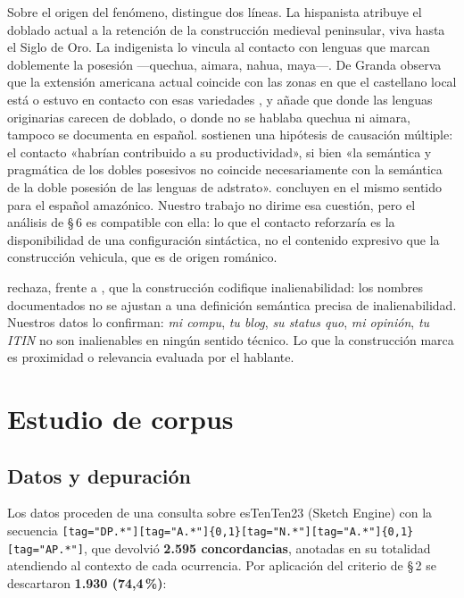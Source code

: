 \documentclass[12pt,a4paper]{article}
\begin{document}
Sobre el origen del fenómeno, \textcite{granda1997} distingue dos líneas. La hispanista atribuye el doblado actual a la retención de la construcción medieval peninsular, viva hasta el Siglo de Oro. La indigenista lo vincula al contacto con lenguas que marcan doblemente la posesión ---quechua, aimara, nahua, maya---. De Granda observa que la extensión americana actual coincide con las zonas en que el castellano local está o estuvo en contacto con esas variedades \parencite[146]{granda1997}, y \textcite{godenzzi2010} añade que donde las lenguas originarias carecen de doblado, o donde no se hablaba quechua ni aimara, tampoco se documenta en español. \textcite[187]{companycompanyhuertaflores2017} sostienen una hipótesis de causación múltiple: el contacto «habrían contribuido a su productividad», si bien «la semántica y pragmática de los dobles posesivos no coincide necesariamente con la semántica de la doble posesión de las lenguas de adstrato». \textcite{rodriguezmondonedofafulas2016} concluyen en el mismo sentido para el español amazónico. Nuestro trabajo no dirime esa cuestión, pero el análisis de \S\,6 es compatible con ella: lo que el contacto reforzaría es la disponibilidad de una configuración sintáctica, no el contenido expresivo que la construcción vehicula, que es de origen románico.

\textcite{eguren2016} rechaza, frente a \textcite{companycompany1995}, que la construcción codifique inalienabilidad: los nombres documentados no se ajustan a una definición semántica precisa de inalienabilidad. Nuestros datos lo confirman: \textit{mi compu}, \textit{tu blog}, \textit{su status quo}, \textit{mi opinión}, \textit{tu ITIN} no son inalienables en ningún sentido técnico. Lo que la construcción marca es proximidad o relevancia evaluada por el hablante.

\section{Estudio de corpus}

\subsection{Datos y depuración}

Los datos proceden de una consulta sobre esTenTen23 (Sketch Engine) con la secuencia \texttt{[tag="DP.*"][tag="A.*"]\{0,1\}[tag="N.*"][tag="A.*"]\{0,1\}[tag="AP.*"]}, que devolvió \textbf{2.595 concordancias}, anotadas en su totalidad atendiendo al contexto de cada ocurrencia. Por aplicación del criterio de \S\,2 se descartaron \textbf{1.930 (74,4\,\%)}:
\end{document}
